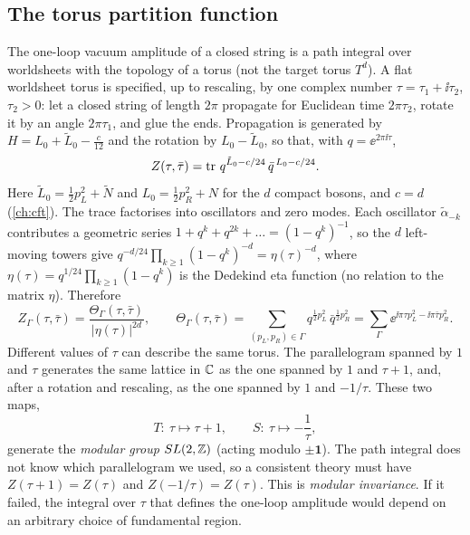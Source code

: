 \subsection{The torus partition function}

The one-loop vacuum amplitude of a closed string is a path integral over worldsheets with the
topology of a torus (not the target torus $T^d$). A flat worldsheet torus is specified, up to
rescaling, by one complex number $\tau=\tau_1+\ii\tau_2$, $\tau_2>0$: let a closed string of
length $2\pi$ propagate for Euclidean time $2\pi\tau_2$, rotate it by an angle $2\pi\tau_1$, and
glue the ends. Propagation is generated by $H=L_0+\tilde L_0-\frac{c}{12}$ and the rotation by
$L_0-\tilde L_0$, so that, with $q=\ee^{2\pi\ii\tau}$,
\begin{equation}\label{eq:narain:Zdef}
 Z(\tau,\bar\tau)=\operatorname{tr}\,q^{\tilde L_0-c/24}\,\bar q^{\,L_0-c/24}.
\end{equation}
Here $\tilde L_0=\frac12p_L^2+\tilde N$ and $L_0=\frac12p_R^2+N$ for the $d$ compact bosons,
and $c=d$ (\cref{ch:cft}). The trace factorises into oscillators and zero modes. Each
oscillator $\tilde\alpha_{-k}$ contributes a geometric series
$1+q^k+q^{2k}+\dots=(1-q^k)^{-1}$, so the $d$ left-moving towers give
$q^{-d/24}\prod_{k\ge1}(1-q^k)^{-d}=\eta(\tau)^{-d}$, where
$\eta(\tau)=q^{1/24}\prod_{k\ge1}(1-q^k)$ is the Dedekind eta function (no relation to the matrix $\eta$). Therefore
\begin{equation}\label{eq:narain:Z}
 Z_\Gamma(\tau,\bar\tau)=\frac{\Theta_\Gamma(\tau,\bar\tau)}{|\eta(\tau)|^{2d}},\qquad
 \Theta_\Gamma(\tau,\bar\tau)=\sum_{(p_L,p_R)\in\Gamma}q^{\frac12p_L^2}\,\bar q^{\frac12p_R^2}
 =\sum_{\Gamma}\ee^{\ii\pi\tau p_L^2-\ii\pi\bar\tau p_R^2}.
\end{equation}
Different values of $\tau$ can describe the same torus. The parallelogram spanned by $1$ and
$\tau$ generates the same lattice in $\mathbb{C}$ as the one spanned by $1$ and $\tau+1$, and, after a
rotation and rescaling, as the one spanned by $1$ and $-1/\tau$. These two maps,
\begin{equation}
 T:\ \tau\mapsto\tau+1,\qquad S:\ \tau\mapsto-\frac1\tau ,
\end{equation}
generate the \emph{modular group} $SL(2,\mathbb{Z})$ (acting modulo $\pm\mathbf 1$).
The path integral does not know which parallelogram we used, so a consistent theory must have
$Z(\tau+1)=Z(\tau)$ and $Z(-1/\tau)=Z(\tau)$. This is
\emph{modular invariance}. If it failed, the integral over $\tau$
that defines the one-loop amplitude would depend on an arbitrary choice of fundamental
region.

